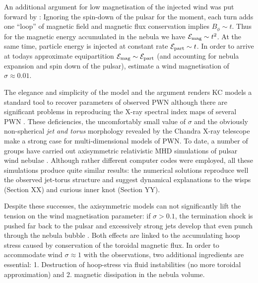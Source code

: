 An additional argument for low magnetisation of the injected wind was put forward by \cite{1974MNRAS.167....1R}:  Ignoring the spin-down of the pulsar for the moment, each turn adds one ``loop'' of magnetic field and magnetic flux conservation implies $B_\phi\sim t$.  Thus for the magnetic energy accumulated in the nebula we have $\mathcal{E}_{\rm mag}\sim t^2$.  At the same time, particle energy is injected at constant rate $\mathcal{E}_{\rm part}\sim t$. In order to arrive at todays approximate equipartition $\mathcal{E}_{\rm mag}\sim\mathcal{E}_{\rm part}$ (and accounting for nebula expansion and spin down of the pulsar), \cite{1974MNRAS.167....1R} estimate a wind magnetisation of $\sigma\approx0.01$.


The elegance and simplicity of the \cite{1984ApJ...283..694K} model and the \cite{1974MNRAS.167....1R} argument renders KC models a standard tool to recover parameters of observed PWN \citep[e.g.][]{sefakodeJager2003,PetreHwang2007} although there are significant problems in reproducing the X-ray spectral index maps of several PWN \citep{reynolds2003,tang2012,NynkaHailey2014,PorthVorster2016}.  
These deficiencies, the uncomfortably small value of $\sigma$ and the obviously non-spherical \emph{jet and torus} morphology revealed by the Chandra X-ray telescope \citep{KargaltsevPavlov2008} make a strong case for multi-dimensional models of PWN.  
To date, a number of groups have carried out axisymmetric relativistic MHD simulations of pulsar wind nebulae \citep{komissarov2003a,komissarov2004,del-zanna2004,bogovalov2005,camus2009,2014MNRAS.438.1518O}. Although rather different computer codes were employed, all these simulations produce quite similar results: the numerical solutions reproduce well the observed jet-torus structure and suggest dynamical explanations to the wisps (Section XX) and curious inner knot (Section YY).  


Despite these successes, the axisymmetric models can not significantly lift the tension on the wind magnetisation parameter:  if $\sigma>0.1$, the termination shock is pushed far back to the pulsar and excessively strong jets develop that even punch through the nebula bubble \citep[e.g.][]{PorthKomissarov2013}.  
Both effects are linked to the accumulating hoop stress caused by conservation of the toroidal magnetic flux.  
In order to accommodate wind $\sigma\approx1$ with the observations, two additional ingredients are essential:  1. Destruction of hoop-stress via fluid instabilities (no more toroidal approximation) and 2. magnetic dissipation in the nebula volume.  

